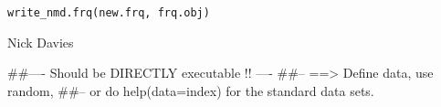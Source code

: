 \documentclass[a4paper]{book}
\begin{document}
%
\begin{Usage}
\begin{verbatim}
write_nmd.frq(new.frq, frq.obj)
\end{verbatim}
\end{Usage}
%
\begin{Arguments}
\begin{ldescription}
\item[\code{new.frq}] 


\item[\code{frq.obj}] 


\end{ldescription}
\end{Arguments}
%
\begin{Author}\relax

Nick Davies
\end{Author}
%
\begin{Examples}
\begin{ExampleCode}
##---- Should be DIRECTLY executable !! ----
##-- ==>  Define data, use random,
##--	or do  help(data=index)  for the standard data sets.

\end{ExampleCode}
\end{Examples}
\printindex{}
\end{document}
